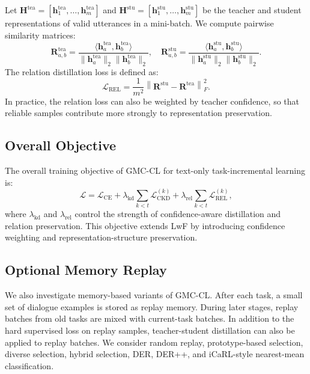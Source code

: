 Let $\mathbf{H}^{\mathrm{tea}}=[\mathbf{h}^{\mathrm{tea}}_1,\ldots,\mathbf{h}^{\mathrm{tea}}_m]$ and $\mathbf{H}^{\mathrm{stu}}=[\mathbf{h}^{\mathrm{stu}}_1,\ldots,\mathbf{h}^{\mathrm{stu}}_m]$ be the teacher and student representations of valid utterances in a mini-batch. We compute pairwise similarity matrices:
\begin{equation}
    \mathbf{R}^{\mathrm{tea}}_{a,b}
    =
    \frac{
    \langle \mathbf{h}^{\mathrm{tea}}_a, \mathbf{h}^{\mathrm{tea}}_b \rangle
    }{
    \|\mathbf{h}^{\mathrm{tea}}_a\|_2 \|\mathbf{h}^{\mathrm{tea}}_b\|_2
    },
    \quad
    \mathbf{R}^{\mathrm{stu}}_{a,b}
    =
    \frac{
    \langle \mathbf{h}^{\mathrm{stu}}_a, \mathbf{h}^{\mathrm{stu}}_b \rangle
    }{
    \|\mathbf{h}^{\mathrm{stu}}_a\|_2 \|\mathbf{h}^{\mathrm{stu}}_b\|_2
    }.
\end{equation}
The relation distillation loss is defined as:
\begin{equation}
    \mathcal{L}_{\mathrm{REL}}
    =
    \frac{1}{m^2}
    \left\|
    \mathbf{R}^{\mathrm{stu}} - \mathbf{R}^{\mathrm{tea}}
    \right\|_F^2.
\end{equation}
In practice, the relation loss can also be weighted by teacher confidence, so that reliable samples contribute more strongly to representation preservation.

\subsection{Overall Objective}
\label{subsec:overall_objective}

The overall training objective of GMC-CL for text-only task-incremental learning is:
\begin{equation}
    \mathcal{L}
    =
    \mathcal{L}_{\mathrm{CE}}
    +
    \lambda_{\mathrm{kd}}
    \sum_{k<t}
    \mathcal{L}^{(k)}_{\mathrm{CKD}}
    +
    \lambda_{\mathrm{rel}}
    \sum_{k<t}
    \mathcal{L}^{(k)}_{\mathrm{REL}},
\end{equation}
where $\lambda_{\mathrm{kd}}$ and $\lambda_{\mathrm{rel}}$ control the strength of confidence-aware distillation and relation preservation. This objective extends LwF by introducing confidence weighting and representation-structure preservation.

\subsection{Optional Memory Replay}
\label{subsec:replay}

We also investigate memory-based variants of GMC-CL. After each task, a small set of dialogue examples is stored as replay memory. During later stages, replay batches from old tasks are mixed with current-task batches. In addition to the hard supervised loss on replay samples, teacher-student distillation can also be applied to replay batches. We consider random replay, prototype-based selection, diverse selection, hybrid selection, DER, DER++, and iCaRL-style nearest-mean classification.

